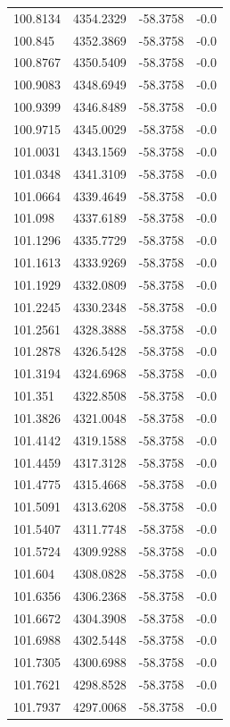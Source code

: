 \begin{table}[H]
\begin{tabular}{llll}
100.8134 & 4354.2329 & -58.3758 & -0.0 \\
100.845 & 4352.3869 & -58.3758 & -0.0 \\
100.8767 & 4350.5409 & -58.3758 & -0.0 \\
100.9083 & 4348.6949 & -58.3758 & -0.0 \\
100.9399 & 4346.8489 & -58.3758 & -0.0 \\
100.9715 & 4345.0029 & -58.3758 & -0.0 \\
101.0031 & 4343.1569 & -58.3758 & -0.0 \\
101.0348 & 4341.3109 & -58.3758 & -0.0 \\
101.0664 & 4339.4649 & -58.3758 & -0.0 \\
101.098 & 4337.6189 & -58.3758 & -0.0 \\
101.1296 & 4335.7729 & -58.3758 & -0.0 \\
101.1613 & 4333.9269 & -58.3758 & -0.0 \\
101.1929 & 4332.0809 & -58.3758 & -0.0 \\
101.2245 & 4330.2348 & -58.3758 & -0.0 \\
101.2561 & 4328.3888 & -58.3758 & -0.0 \\
101.2878 & 4326.5428 & -58.3758 & -0.0 \\
101.3194 & 4324.6968 & -58.3758 & -0.0 \\
101.351 & 4322.8508 & -58.3758 & -0.0 \\
101.3826 & 4321.0048 & -58.3758 & -0.0 \\
101.4142 & 4319.1588 & -58.3758 & -0.0 \\
101.4459 & 4317.3128 & -58.3758 & -0.0 \\
101.4775 & 4315.4668 & -58.3758 & -0.0 \\
101.5091 & 4313.6208 & -58.3758 & -0.0 \\
101.5407 & 4311.7748 & -58.3758 & -0.0 \\
101.5724 & 4309.9288 & -58.3758 & -0.0 \\
101.604 & 4308.0828 & -58.3758 & -0.0 \\
101.6356 & 4306.2368 & -58.3758 & -0.0 \\
101.6672 & 4304.3908 & -58.3758 & -0.0 \\
101.6988 & 4302.5448 & -58.3758 & -0.0 \\
101.7305 & 4300.6988 & -58.3758 & -0.0 \\
101.7621 & 4298.8528 & -58.3758 & -0.0 \\
101.7937 & 4297.0068 & -58.3758 & -0.0 \\

\end{tabular}
\end{table}
